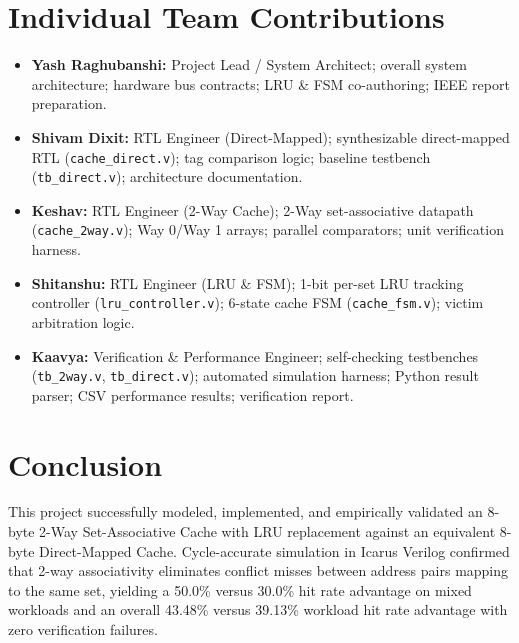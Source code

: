 \documentclass[10pt,twocolumn]{article}
\begin{document}
\section{Individual Team Contributions}
\begin{itemize}
    \item \textbf{Yash Raghubanshi:} Project Lead / System Architect; overall system architecture; hardware bus contracts; LRU \& FSM co-authoring; IEEE report preparation.
    \item \textbf{Shivam Dixit:} RTL Engineer (Direct-Mapped); synthesizable direct-mapped RTL (\texttt{cache\_direct.v}); tag comparison logic; baseline testbench (\texttt{tb\_direct.v}); architecture documentation.
    \item \textbf{Keshav:} RTL Engineer (2-Way Cache); 2-Way set-associative datapath (\texttt{cache\_2way.v}); Way 0/Way 1 arrays; parallel comparators; unit verification harness.
    \item \textbf{Shitanshu:} RTL Engineer (LRU \& FSM); 1-bit per-set LRU tracking controller (\texttt{lru\_controller.v}); 6-state cache FSM (\texttt{cache\_fsm.v}); victim arbitration logic.
    \item \textbf{Kaavya:} Verification \& Performance Engineer; self-checking testbenches (\texttt{tb\_2way.v}, \texttt{tb\_direct.v}); automated simulation harness; Python result parser; CSV performance results; verification report.
\end{itemize}

\section{Conclusion}
This project successfully modeled, implemented, and empirically validated an 8-byte 2-Way Set-Associative Cache with LRU replacement against an equivalent 8-byte Direct-Mapped Cache. Cycle-accurate simulation in Icarus Verilog confirmed that 2-way associativity eliminates conflict misses between address pairs mapping to the same set, yielding a 50.0\% versus 30.0\% hit rate advantage on mixed workloads and an overall 43.48\% versus 39.13\% workload hit rate advantage with zero verification failures.
\end{document}

